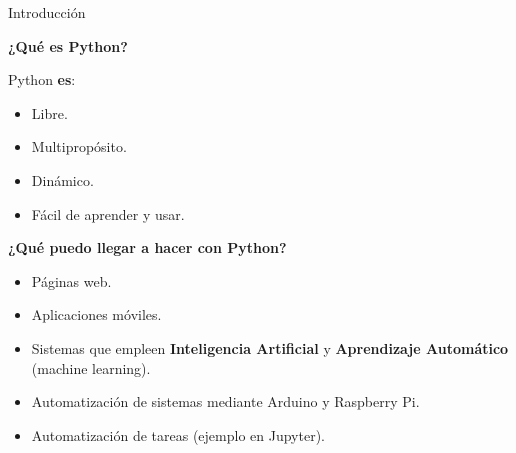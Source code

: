 \begin{frame}[t]{Introducción}\vspace{5pt}

\textbf{¿Qué es Python?}

\vspace{2pt}

Python \textbf{es}:

\begin{itemize}
	\item Libre.
	\item Multipropósito.
	\item Dinámico.
	\item Fácil de aprender y usar.
\end{itemize}

\vspace{5pt}

\textbf{¿Qué puedo llegar a hacer con Python?}

\begin{itemize}
	\item Páginas web.
	\item Aplicaciones móviles.
	\item Sistemas que empleen \textbf{Inteligencia Artificial} y \textbf{Aprendizaje Automático} (machine learning).
	\item Automatización de sistemas mediante Arduino y Raspberry Pi.
	\item Automatización de tareas (ejemplo en Jupyter).
\end{itemize}

\end{frame}